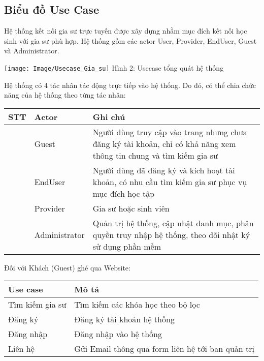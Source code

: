 \documentclass[12pt,a4paper]{report}
\begin{document}
\subsection{Biểu đồ Use Case}
Hệ thống kết nối gia sư trực tuyến được xây dựng nhằm mục đích kết nối học sinh với gia sư phù hợp. Hệ thống gồm các actor User, Provider, EndUser, Guest và Administrator.\\
\begin{center}
    \begin{center}
     \texttt{[image: Image/Usecase\_Gia\_su]}
     Hình 2: Usecase tổng quát hệ thống
    \end{center}
\end{center}
Hệ thống có 4 tác nhân tác động trực tiếp vào hệ thống. Do đó, có thể chia chức
năng của hệ thống theo từng tác nhân:
\begin{center}
\begin{tabular}{| >{\centering\arraybackslash}m{1cm}| >{\centering\arraybackslash}m{3cm}|>{\raggedright\arraybackslash}m{11.5cm}|}
\hline 
STT & Actor & Ghi chú \\ 
\hline 
1 & Guest & Người dùng truy cập vào trang nhưng chưa đăng ký tài khoản, chỉ có khả năng xem thông tin chung và tìm kiếm gia sư \\ 
\hline 
2 & EndUser & Người dùng đã đăng ký và kích hoạt tài khoản, có nhu cầu tìm kiếm gia sư phục vụ mục đích học tập\\ 
\hline 
3 & Provider & Gia sư hoặc sinh viên  \\ 
\hline 
4 & Administrator & Quản trị hệ thống, cập nhật danh mục, phân quyền truy nhập hệ thống, theo dõi nhật ký sử dụng phần mềm \\ 
\hline 
\end{tabular} 
\end{center}

Đối với Khách (Guest) ghé qua Website:
\begin{center}
 \begin{tabular}{|>{\raggedright\arraybackslash}m{4cm}|>{\raggedright\arraybackslash}m{11.5cm}|}
 \hline 
\textbf{Use case} & \textbf{Mô tả} \\
\hline
Tìm kiếm gia sư & Tìm kiếm các khóa học theo bộ lọc \\ 
\hline 
Đăng ký & Đăng ký tài khoản hệ thống \\ 
\hline 
Đăng nhập & Đăng nhập vào hệ thống \\ 
\hline 
Liên hệ  & Gửi Email thông qua form liên hệ tới ban quản trị \\ 
\hline 
 \end{tabular}
\end{center} 
\end{document}
